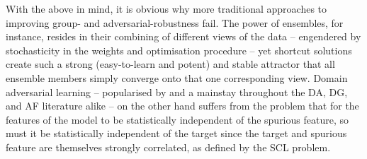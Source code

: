 With the above in mind, it is obvious why more traditional approaches to improving group- and
adversarial-robustness fail. 
%
The power of ensembles, for instance, resides in their combining of different views of the data --
engendered by stochasticity in the weights and optimisation procedure -- yet shortcut solutions
create such a strong (easy-to-learn and potent) and stable attractor that all ensemble
members simply converge onto that one corresponding view.
%
Domain adversarial learning -- popularised by \citet{ganin2016domain} and a mainstay throughout the
\ac{DA}, \ac{DG}, and \ac{AF} literature alike -- on the other hand suffers from the problem that
for the features of the model to be statistically independent of the spurious feature, so must it
be statistically independent of the target since the target and spurious feature are themselves
strongly correlated, as defined by the \ac{SCL} problem.


